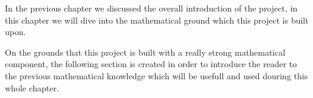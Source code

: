 In the previous chapter we discussed the overall introduction of the project, in this chapter we will dive into the mathematical ground which this project is built upon.

On the grounds that this project is built with a really strong mathematical component, the following section is created in order to introduce the reader to the previous mathematical knowledge which will be usefull and used douring this whole chapter.